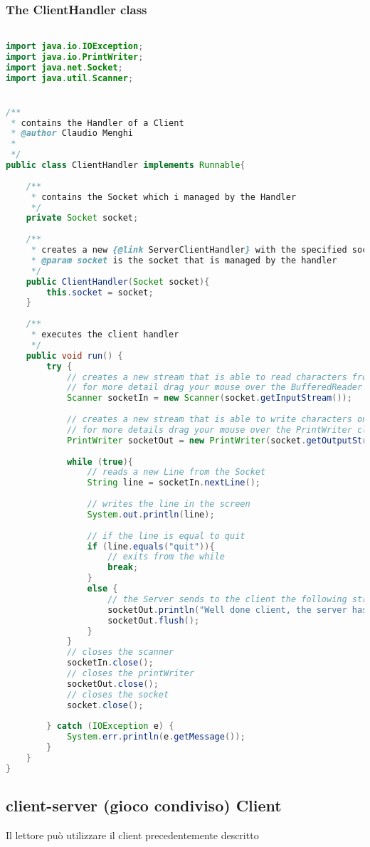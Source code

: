 \documentclass{article}
\begin{document}
\subsubsection{The ClientHandler class}
\begin{lstlisting}[language=Java,escapechar=|]

import java.io.IOException;
import java.io.PrintWriter;
import java.net.Socket;
import java.util.Scanner;


/**
 * contains the Handler of a Client
 * @author Claudio Menghi
 *
 */
public class ClientHandler implements Runnable{
	
	/**
	 * contains the Socket which i managed by the Handler
	 */
	private Socket socket;
	
	/**
	 * creates a new {@link ServerClientHandler} with the specified socket
	 * @param socket is the socket that is managed by the handler
	 */
	public ClientHandler(Socket socket){
		this.socket = socket;
	}
	
	/**
	 * executes the client handler
	 */
	public void run() {
		try {
			// creates a new stream that is able to read characters from the socket
			// for more detail drag your mouse over the BufferedReader class
			Scanner socketIn = new Scanner(socket.getInputStream());
			
			// creates a new stream that is able to write characters on the socket
			// for more details drag your mouse over the PrintWriter class
			PrintWriter socketOut = new PrintWriter(socket.getOutputStream());
			
			while (true){				
				// reads a new Line from the Socket
				String line = socketIn.nextLine();
				
				// writes the line in the screen
				System.out.println(line);
				
				// if the line is equal to quit
				if (line.equals("quit")){
					// exits from the while
					break;
				}
				else {
					// the Server sends to the client the following string
					socketOut.println("Well done client, the server has reveived the String: " + line);
					socketOut.flush();
				}
			}
			// closes the scanner
			socketIn.close();
			// closes the printWriter
			socketOut.close();
			// closes the socket
			socket.close();
			
		} catch (IOException e) {
			System.err.println(e.getMessage());
		}
	}
}
\end{lstlisting}

\subsection{client-server (gioco condiviso) Client}
\label{clientservershared}
Il lettore pu\`o utilizzare il client precedentemente descritto
\end{document}
